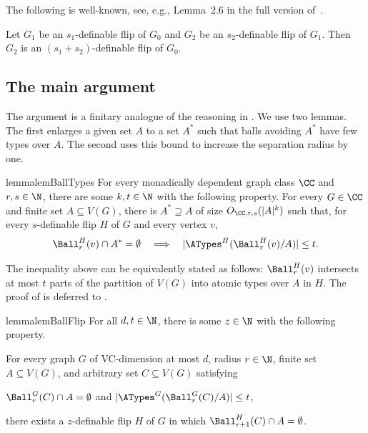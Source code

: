 The following is well-known, see, e.g., Lemma~2.6 in the full version of~\cite{flippers}.

\begin{fact}\label{lem:definable-flip-transitive}
    Let $G_1$ be an $s_1$-definable flip of $G_0$ and $G_2$ be an $s_2$-definable flip of $G_1$. Then $G_2$ is an $(s_1 + s_2)$-definable flip of $G_0$.
\end{fact}

\subsection{The main argument}\label{sec:closures-main}

The argument is a finitary analogue of the reasoning in \cite[Section 7]{flippers}.
We use two lemmas. The first enlarges a given set $A$ to a set $A^*$ such that balls avoiding $A^*$ have few types over $A$. The second uses this bound to increase the separation radius by one.

\begin{restatable}{lemma}{lemBallTypes}\label{lem:ball-types}
    For every monadically dependent graph class $\CC$ and $r,s\in\N$, there are some $k,t\in\N$ with the following property.
    For every $G\in\CC$ and finite set $A\subseteq V(G)$, there is $A^*\supseteq A$ of size $O_{\CC,r,s}(|A|^k)$ such that, for every $s$-definable flip $H$ of $G$ and every vertex $v$,
    \[
        \Ball_r^H(v)\cap A^*=\emptyset
        \quad\Longrightarrow\quad
        |\ATypes^H(\Ball_r^H(v)/A)|\leq t.
    \]
\end{restatable}

The inequality above
can be equivalently stated as follows:
 $\Ball_r^H(v)$ intersects at most $t$ parts of
the partition of $V(G)$ into atomic types over $A$ in $H$.
The proof of  is deferred to .

\begin{restatable}{lemma}{lemBallFlip}\label{lem:ball-flip}
For all $d,t\in \N$, there is some $z\in\N$ with the following property.

\smallskip\noindent
For every graph $G$ of VC-dimension at most $d$, radius $r\in\N$, finite set $A\subseteq V(G)$, and arbitrary set $C\subseteq V(G)$ satisfying
\begin{center}
    $\Ball_r^G(C) \cap A = \emptyset$
    \qquad and \qquad
    $|\ATypes^G(\Ball_r^G(C)/A)|\leq t$,
\end{center}
there exists a $z$-definable flip $H$ of $G$ in which $\Ball_{r+1}^H(C) \cap A = \emptyset$.
\end{restatable}

